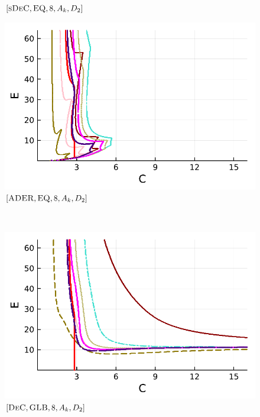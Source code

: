 \begin{figure}
\begin{minipage}[t]{0.32\textwidth}
		\centering
		$[\textsc{sDeC},\textsc{EQ},8, A_k,D_2]$
	\end{minipage}
	\begin{minipage}[t]{0.32\textwidth}
		\includegraphics[width=\textwidth]{pdf/pdepics/diff/IMEXADER_equispaced_adv_ord_1-8.pdf}
		\centering
		$[\textsc{ADER},\textsc{EQ},8, A_k,D_2]$
	\end{minipage}\\
	\begin{minipage}[t]{0.32\textwidth}
		\includegraphics[width=\textwidth]{pdf/pdepics/diff/IMEXDeC_gaussLobatto_adv_ord_1-8.pdf}
		\centering
		$[\textsc{DeC},\textsc{GLB},8, A_k,D_2]$
	\end{minipage}
	\begin{minipage}[t]{0.32\textwidth}

\end{minipage}
\end{figure}
